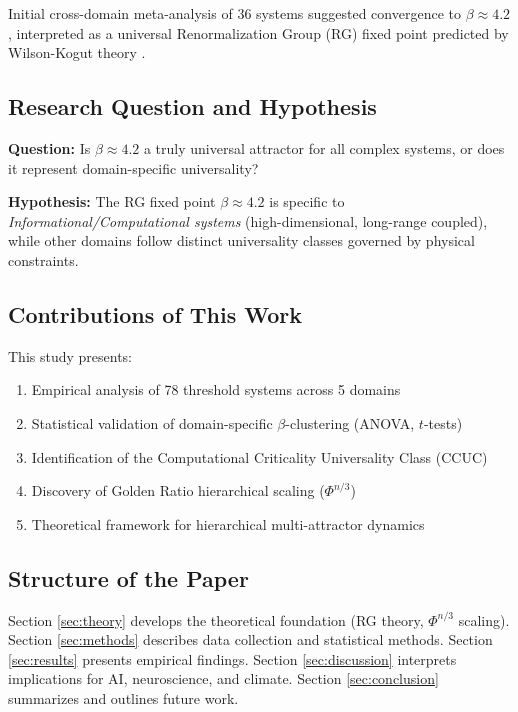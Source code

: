 \documentclass[11pt,a4paper]{article}
\begin{document}
Initial cross-domain meta-analysis of 36 systems suggested convergence to $\beta \approx 4.2$ \cite{Romer2024}, interpreted as a universal Renormalization Group (RG) fixed point predicted by Wilson-Kogut theory \cite{Wilson1971,Wilson1974}.

\subsection{Research Question and Hypothesis}

\textbf{Question:} Is $\beta \approx 4.2$ a truly universal attractor for all complex systems, or does it represent domain-specific universality?

\textbf{Hypothesis:} The RG fixed point $\beta \approx 4.2$ is specific to \textit{Informational/Computational systems} (high-dimensional, long-range coupled), while other domains follow distinct universality classes governed by physical constraints.

\subsection{Contributions of This Work}

This study presents:

\begin{enumerate}
\item Empirical analysis of 78 threshold systems across 5 domains
\item Statistical validation of domain-specific $\beta$-clustering (ANOVA, $t$-tests)
\item Identification of the Computational Criticality Universality Class (CCUC)
\item Discovery of Golden Ratio hierarchical scaling ($\Phi^{n/3}$)
\item Theoretical framework for hierarchical multi-attractor dynamics
\end{enumerate}

\subsection{Structure of the Paper}

Section \ref{sec:theory} develops the theoretical foundation (RG theory, $\Phi^{n/3}$ scaling). Section \ref{sec:methods} describes data collection and statistical methods. Section \ref{sec:results} presents empirical findings. Section \ref{sec:discussion} interprets implications for AI, neuroscience, and climate. Section \ref{sec:conclusion} summarizes and outlines future work.
\end{document}
